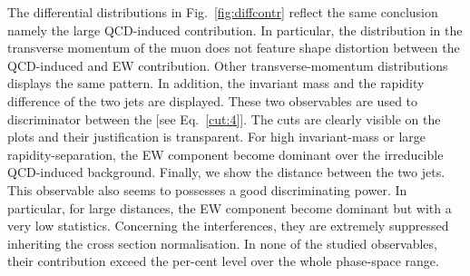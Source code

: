 \documentclass[11pt]{cernrep}
\begin{document}
The differential distributions in Fig.~\ref{fig:diffcontr} reflect the same conclusion namely the large QCD-induced contribution.
In particular, the distribution in the transverse momentum of the muon does not feature shape distortion between the QCD-induced and EW contribution.
Other transverse-momentum distributions displays the same pattern.
In addition, the invariant mass and the rapidity difference of the two jets are displayed.
These two observables are used to discriminator between the [see Eq.~\eqref{cut:4}].
The cuts are clearly visible on the plots and their justification is transparent.
For high invariant-mass or large rapidity-separation, the EW component become dominant over the irreducible QCD-induced background.
Finally, we show the distance between the two jets.
This observable also seems to possesses a good discriminating power.
In particular, for large distances, the EW component become dominant but with a very low statistics.
Concerning the interferences, they are extremely suppressed inheriting the cross section normalisation.
In none of the studied observables, their contribution exceed the per-cent level over the whole phase-space range.
\end{document}
